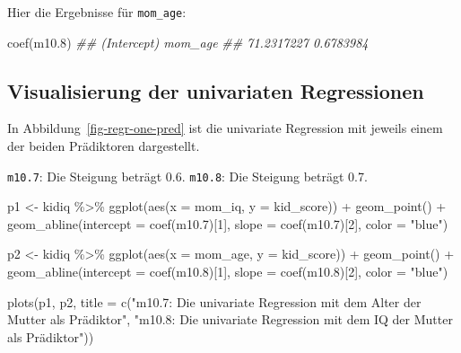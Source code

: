 \documentclass[
  a4paper,
  DIV=11]{scrreprt}
\newenvironment{Shaded}{\begin{snugshade}}{\end{snugshade}}
\newcommand{\AttributeTok}[1]{\textcolor[rgb]{0.40,0.45,0.13}{#1}}
\newcommand{\DecValTok}[1]{\textcolor[rgb]{0.68,0.00,0.00}{#1}}
\newcommand{\DocumentationTok}[1]{\textcolor[rgb]{0.37,0.37,0.37}{\textit{#1}}}
\newcommand{\FloatTok}[1]{\textcolor[rgb]{0.68,0.00,0.00}{#1}}
\newcommand{\FunctionTok}[1]{\textcolor[rgb]{0.28,0.35,0.67}{#1}}
\newcommand{\NormalTok}[1]{\textcolor[rgb]{0.00,0.23,0.31}{#1}}
\newcommand{\OtherTok}[1]{\textcolor[rgb]{0.00,0.23,0.31}{#1}}
\newcommand{\SpecialCharTok}[1]{\textcolor[rgb]{0.37,0.37,0.37}{#1}}
\newcommand{\StringTok}[1]{\textcolor[rgb]{0.13,0.47,0.30}{#1}}
\theoremstyle{definition}
\theoremstyle{remark}
\begin{document}
Hier die Ergebnisse für \texttt{mom\_age}:

\begin{Shaded}
\begin{Highlighting}[]
\FunctionTok{coef}\NormalTok{(m10}\FloatTok{.8}\NormalTok{)}
\DocumentationTok{\#\# (Intercept)     mom\_age }
\DocumentationTok{\#\#  71.2317227   0.6783984}
\end{Highlighting}
\end{Shaded}

\hypertarget{visualisierung-der-univariaten-regressionen}{%
\subsection{Visualisierung der univariaten
Regressionen}\label{visualisierung-der-univariaten-regressionen}}

In Abbildung~\ref{fig-regr-one-pred} ist die univariate Regression mit
jeweils einem der beiden Prädiktoren dargestellt.

\texttt{m10.7}: Die Steigung beträgt 0.6. \texttt{m10.8}: Die Steigung
beträgt 0.7.

\begin{Shaded}
\begin{Highlighting}[]
\NormalTok{p1 }\OtherTok{\textless{}{-}} 
\NormalTok{  kidiq }\SpecialCharTok{\%\textgreater{}\%} 
  \FunctionTok{ggplot}\NormalTok{(}\FunctionTok{aes}\NormalTok{(}\AttributeTok{x =}\NormalTok{ mom\_iq, }\AttributeTok{y =}\NormalTok{ kid\_score)) }\SpecialCharTok{+}
  \FunctionTok{geom\_point}\NormalTok{() }\SpecialCharTok{+}
  \FunctionTok{geom\_abline}\NormalTok{(}\AttributeTok{intercept =} \FunctionTok{coef}\NormalTok{(m10}\FloatTok{.7}\NormalTok{)[}\DecValTok{1}\NormalTok{],}
              \AttributeTok{slope =} \FunctionTok{coef}\NormalTok{(m10}\FloatTok{.7}\NormalTok{)[}\DecValTok{2}\NormalTok{],}
              \AttributeTok{color =} \StringTok{"blue"}\NormalTok{) }

\NormalTok{p2 }\OtherTok{\textless{}{-}} 
\NormalTok{kidiq }\SpecialCharTok{\%\textgreater{}\%} 
  \FunctionTok{ggplot}\NormalTok{(}\FunctionTok{aes}\NormalTok{(}\AttributeTok{x =}\NormalTok{ mom\_age, }\AttributeTok{y =}\NormalTok{ kid\_score)) }\SpecialCharTok{+}
  \FunctionTok{geom\_point}\NormalTok{() }\SpecialCharTok{+}
  \FunctionTok{geom\_abline}\NormalTok{(}\AttributeTok{intercept =} \FunctionTok{coef}\NormalTok{(m10}\FloatTok{.8}\NormalTok{)[}\DecValTok{1}\NormalTok{],}
              \AttributeTok{slope =} \FunctionTok{coef}\NormalTok{(m10}\FloatTok{.8}\NormalTok{)[}\DecValTok{2}\NormalTok{],}
              \AttributeTok{color =} \StringTok{"blue"}\NormalTok{)}

\FunctionTok{plots}\NormalTok{(p1, p2,}
      \AttributeTok{title =} \FunctionTok{c}\NormalTok{(}\StringTok{"m10.7: Die univariate Regression mit dem Alter der Mutter als Prädiktor"}\NormalTok{,}
        \StringTok{"m10.8: Die univariate Regression mit dem IQ der Mutter als Prädiktor"}\NormalTok{))}
\end{Highlighting}
\end{Shaded}
\end{document}
